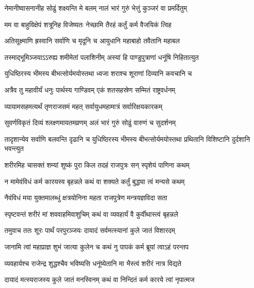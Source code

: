 \twolineshloka
{नेमानीष्वासनानीह सोढुं शक्ष्यन्ति मे बलम्}
{नालं भारं गुरुं भेत्तुं कुञ्जरं वा प्रमर्दितुम्}


\twolineshloka
{मम वा बाहुविक्षेपं शत्रूनिह विजेष्यतः}
{नेच्छामि तैरहं कर्तुं कर्म वैजयिकं त्विह}


\twolineshloka
{अतिसूक्ष्माणि ह्रस्वानि सर्वाणि च मृदूनि च}
{आयुधानि महाबाहो तवैतानि महाबल}


\twolineshloka
{तस्माद्भूमिञ्जयाऽऽरुह्य शमीमेतां पलाशिनीम्}
{अस्यां हि पाण्डुपुत्राणां धनूंषि निहितात्युत}


\twolineshloka
{युधिष्ठिरस्य भीमस्य बीभत्सोर्यमयोस्तथा}
{ध्वजा शराश्च शूराणां दिव्यानि कवचानि च}


\twolineshloka
{अत्रैव तु महावीर्यं धनुः पार्थस्य गाण्डिवम्}
{एकं शतसहस्रेण सम्मितं राष्ट्रवर्धनम्}


\twolineshloka
{व्यायामसहमत्यर्थं तृणराजसमं महत्}
{सर्वायुधमहामात्रं सर्वारिक्षयकारकम्}


\twolineshloka
{सुवर्णविकृतं दिव्यं श्लक्ष्णमायतमव्रणम्}
{अलं भारं गुरुं सोढुं वारुणं च सुदर्शनम्}


\threelineshloka
{तादृशान्येव सर्वाणि बलवन्ति दृढानि च}
{युधिष्ठिरस्य भीमस्य बीभत्सोर्यमयोस्तथा}
{प्रथितानि विशिष्टानि दुर्दशानि भवन्त्युत}




\twolineshloka
{शरीरमिह चासक्तं शम्यां शुष्कं पुरा किल}
{तदहं राजपुत्रः सन् स्पृशेयं पाणिना कथम्}


\twolineshloka
{न मामेवंविधं कर्म कारयस्व बृहन्नले}
{कथं वा शक्यते कर्तुं बुद्ध्या त्वं मन्यसे कथम्}


\twolineshloka
{नैवंविधं मया युक्तमालब्धुं क्षत्रयोनिना}
{महता राजपुत्रेण मन्त्रयज्ञविदा सता}


\twolineshloka
{स्पृष्टवन्तं शरीरं मां शववाहमिवाशुचिम्}
{कथं वा व्यवहार्यं वै कुर्वीथास्त्वं बृहन्नले}



\twolineshloka
{तमुवाच ततः शूरः पार्थं परपुरञ्जयः}
{दायादं सर्वमत्स्यानां कुले जातं विशारदम्}


\twolineshloka
{जानामि त्वां महाप्राज्ञ शुभं जात्या कुलेन च}
{कथं नु पापकं कर्म ब्रूयां त्वाऽहं परन्तप}


\twolineshloka
{व्यवहार्यश्च राजेन्द्र शुद्धश्चैव भविष्यसि}
{धनूंष्येतानि मा भैस्त्वं शरीरं नात्र विद्यते}


\twolineshloka
{दायादं मत्स्यराजस्य कुले जातं मनस्विनम्}
{कथं वा निन्दितं कर्म कारये त्वां नृपात्मज}


